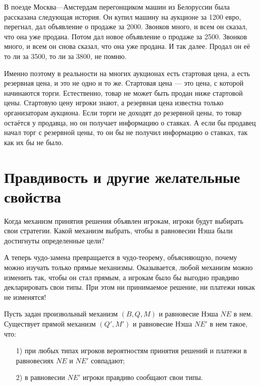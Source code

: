 В поезде Москва—Амстердам перегонщиком машин из Белоруссии была рассказана следующая история. Он купил машину на аукционе за 1200 евро, перегнал, дал объявление о продаже за 2000. Звонков много, и всем он сказал, что она уже продана. Потом дал новое  объявление о продаже за 2500. Звонков много, и всем он снова сказал, что она уже продана. И так далее. Продал он её то ли за 3500, то ли за 3800, не помню.

Именно поэтому в реальности на многих аукционах есть стартовая цена, а есть резервная цена, и это не одно и то же. Стартовая цена — это цена, с которой начинаются торги. Естественно, товар не может быть продан ниже стартовой цены. Стартовую цену игроки знают, а резервная цена известна только организаторам аукциона. Если торги не доходят до резервной цены, то товар остаётся у продавца, но он получает информацию о ставках. А если бы продавец начал торг с резервной цены, то он бы не получил информацию о ставках, так как их бы не было.


\section{Правдивость и другие желательные свойства}

Когда механизм принятия решения объявлен игрокам, игроки будут выбирать свои стратегии. Какой механизм выбрать, чтобы в равновесии Нэша были достигнуты определенные цели?

А теперь чудо-замена превращается в чудо-теорему, объясняющую, почему можно изучать только прямые механизмы. Оказывается, любой механизм можно изменить так, чтобы он стал прямым, а игрокам было бы выгодно правдиво декларировать свои типы. При этом ни принимаемое решение, ни платежи никак не изменятся!

\begin{myth} \label{revelation_principle}
Пусть задан произвольный механизм $ (B, Q, M) $ и равновесие Нэша $NE$ в нем. Существует прямой механизм $ (Q', M') $ и равновесие Нэша $NE'$ в нем такое, что:
\begin{enumerate}
\item[1)] при любых типах игроков вероятностям принятия решений и платежи в равновесиях $ NE $ и $ NE' $ совпадают;
\item[2)] в равновесии $ NE' $ игроки правдиво сообщают свои типы.
\end{enumerate}
\end{myth}

